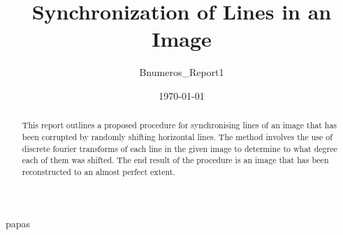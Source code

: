 \documentclass[a4paper,10pt]{article}
\title{Synchronization of Lines in an Image}
\author{Bnumeros\_Report1}
\date{\today}
\begin{document}
\maketitle

\begin{abstract}
 This report outlines a proposed procedure for synchronising lines of an image that has been corrupted by randomly shifting horizontal lines. The method involves the use of discrete fourier transforms of each line in the given image to determine to what degree each of them was shifted. The end result of the procedure is an image that has been reconstructed to an almost perfect extent.
\end{abstract}

papas
\end{document}
